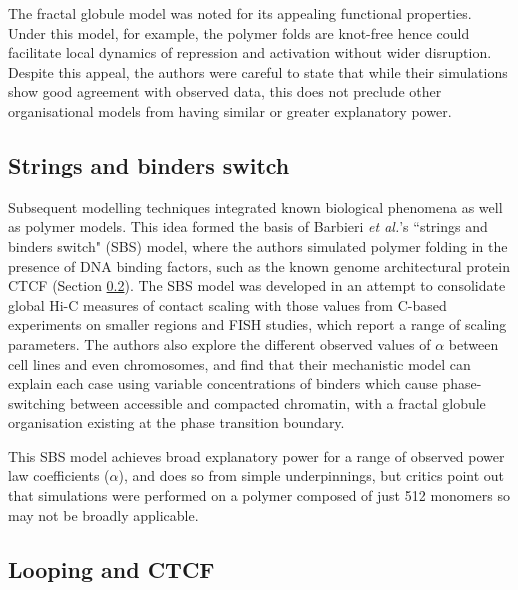 \documentclass[a4paper,11pt,oneside]{book}
\begin{document}

The fractal globule model was noted for its appealing functional properties. Under this model, for example, the polymer folds are knot-free hence could facilitate local dynamics of repression and activation without wider disruption. Despite this appeal, the authors were careful to state that while their simulations show good agreement with observed data, this does not preclude other organisational models from having similar or greater explanatory power.\cite{Lieberman2009}

\subsection{Strings and binders switch}\label{intro:sbs}

Subsequent modelling techniques integrated known biological phenomena as well as polymer models. This idea formed the basis of Barbieri \emph{et al.}'s\cite{Barbieri2012} ``strings and binders switch" (SBS) model, where the authors simulated polymer folding in the presence of DNA binding factors, such as the known genome architectural protein CTCF (Section \ref{intro:loops}). The SBS model was developed in an attempt to consolidate global Hi-C measures of contact scaling with those values from C-based experiments on smaller regions and FISH studies, which report a range of scaling parameters. The authors also explore the different observed values of $\alpha$ between cell lines and even chromosomes, and find that their mechanistic model can explain each case using variable concentrations of binders which cause phase-switching between accessible and compacted chromatin, with a fractal globule organisation existing at the phase transition boundary.\cite{Barbieri2012}

This SBS model achieves broad explanatory power for a range of observed power law coefficients ($\alpha$), and does so from simple underpinnings, but critics point out that simulations were performed on a polymer composed of just 512 monomers so may not be broadly applicable.\cite{Dekker2013}

\subsection{Looping and CTCF}\label{intro:loops}
\end{document}
